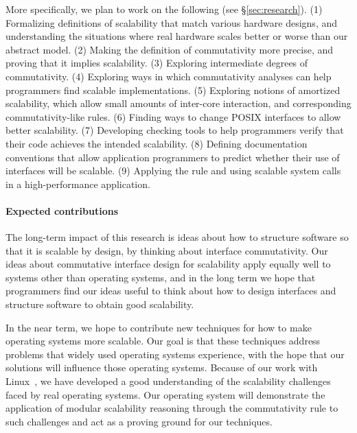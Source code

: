 More specifically, we plan to work on the following (see
\S\ref{sec:research}).
(1) Formalizing definitions of scalability that match various
hardware designs, and understanding the situations where real
hardware scales better or worse than our abstract model.
(2) Making the definition of commutativity more precise,
and proving that it implies scalability.
(3) Exploring intermediate degrees of commutativity.
(4) Exploring ways in which commutativity analyses can help
programmers find scalable implementations.
(5) Exploring notions of amortized scalability, which allow
small amounts of inter-core interaction, and corresponding
commutativity-like rules.
(6) Finding ways to change POSIX interfaces to allow better
scalability.
(7) Developing checking tools to help programmers verify that
their code achieves the intended scalability.
(8) Defining documentation conventions that allow application
programmers to predict whether their use of interfaces will
be scalable.
(9) Applying the rule and using scalable system calls in a
high-performance application.

\paragraph{Expected contributions}

The long-term impact of this research is ideas about how to structure
software so that it is scalable by design, by thinking about interface
commutativity.  Our ideas about commutative interface design for
scalability apply equally well to systems other than operating
systems, and in the long term we hope that programmers find our ideas
useful to think about how to design interfaces and structure software
to obtain good scalability.

In the near term, we hope to contribute new techniques for how to make
operating systems more scalable.  Our goal is that these techniques
address problems that widely used operating systems experience, with
the hope that our solutions will influence those operating systems.
Because of our work with
Linux~\cite{boyd-wickizer:scaling,clements:bonsai}, we have developed
a good understanding of the scalability challenges faced by real
operating systems.  Our \sys operating system will demonstrate the
application of modular scalability reasoning through the commutativity
rule to such challenges and act as a proving ground for our
techniques.
